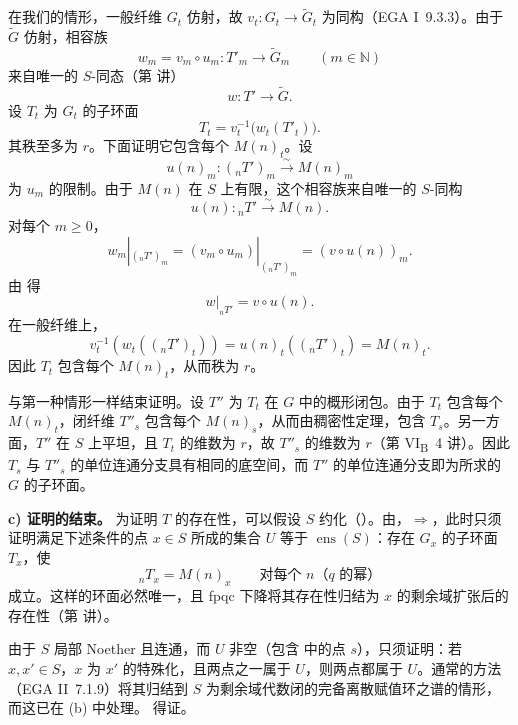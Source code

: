 在我们的情形，一般纤维 \(G_t\) 仿射，故 \(v_t:G_t\to\widetilde G_t\) 为同构（EGA I~9.3.3）。由于 \(\widetilde G\) 仿射，相容族
\[
  w_m=v_m\circ u_m:T'_m\longrightarrow\widetilde G_m
  \qquad(m\in\mathbb N)
\]
来自唯一的 \(S\)-同态（第  讲）
\[
  w:T'\longrightarrow\widetilde G.
\]
设 \(T_t\) 为 \(G_t\) 的子环面
\[
  T_t=v_t^{-1}\bigl(w_t(T'_t)\bigr).
\]
其秩至多为 \(r\)。下面证明它包含每个 \(M(n)_t\)。设
\[
 u(n)_m:({}_nT')_m\xrightarrow{\sim}M(n)_m
\]
为 \(u_m\) 的限制。由于 \(M(n)\) 在 \(S\) 上有限，这个相容族来自唯一的 \(S\)-同构
\[
  u(n):{}_nT'\xrightarrow{\sim}M(n).
\]
对每个 \(m\geq0\)，
\[
 w_m|_{({}_nT')_m}
  =(v_m\circ u_m)|_{({}_nT')_m}
  =(v\circ u(n))_m.
\]
由 得
\[
  w|_{{}_nT'}=v\circ u(n).
\]
在一般纤维上，
\[
 v_t^{-1}\!\left(w_t(({}_nT')_t)\right)
 =u(n)_t(({}_nT')_t)=M(n)_t.
\]
因此 \(T_t\) 包含每个 \(M(n)_t\)，从而秩为 \(r\)。

与第一种情形一样结束证明。设 \(T''\) 为 \(T_t\) 在 \(G\) 中的概形闭包。由于 \(T_t\) 包含每个 \(M(n)_t\)，闭纤维 \(T''_s\) 包含每个 \(M(n)_s\)，从而由稠密性定理，包含 \(T_s\)。另一方面，\(T''\) 在 \(S\) 上平坦，且 \(T_t\) 的维数为 \(r\)，故 \(T''_s\) 的维数为 \(r\)（第 VI\textsubscript{B}~4 讲）。因此 \(T_s\) 与 \(T''_s\) 的单位连通分支具有相同的底空间，而 \(T''\) 的单位连通分支即为所求的 \(G\) 的子环面。

\medskip\noindent
\textbf{c) 证明的结束。}
为证明 \(T\) 的存在性，可以假设 \(S\) 约化（）。由，\(\Rightarrow\)，此时只须证明满足下述条件的点 \(x\in S\) 所成的集合 \(U\) 等于 \(\operatorname{ens}(S)\)：存在 \(G_x\) 的子环面 \(T_x\)，使
\[
  {}_nT_x=M(n)_x
  \qquad\text{对每个 }n\text{（}q\text{ 的幂）}
\]
成立。这样的环面必然唯一，且 fpqc 下降将其存在性归结为 \(x\) 的剩余域扩张后的存在性（第  讲）。

由于 \(S\) 局部 Noether 且连通，而 \(U\) 非空（包含 中的点 \(s\)），只须证明：若 \(x,x'\in S\)，\(x\) 为 \(x'\) 的特殊化，且两点之一属于 \(U\)，则两点都属于 \(U\)。通常的方法（EGA II~7.1.9）将其归结到 \(S\) 为剩余域代数闭的完备离散赋值环之谱的情形，而这已在 (b) 中处理。 得证。


